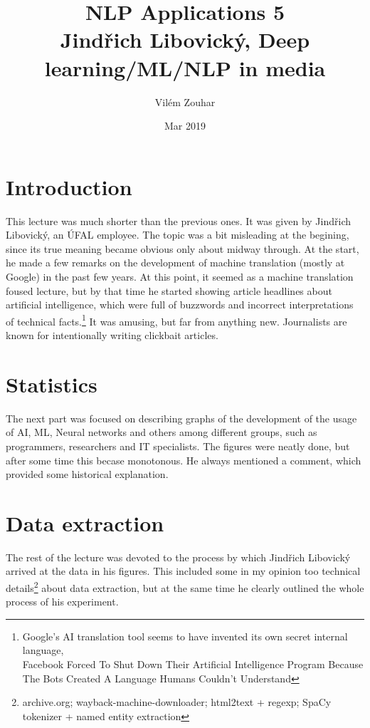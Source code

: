\documentclass[a4paper]{article}
\begin{document}
\title{NLP Applications 5\\Jindřich Libovický, Deep learning/ML/NLP in media}
\author{Vilém Zouhar}
\date{Mar 2019}
\maketitle 

\section*{Introduction}

This lecture was much shorter than the previous ones. It was given by Jindřich Libovický, an ÚFAL employee. The topic was a bit misleading at the begining, since its true meaning became obvious only about midway through. At the start, he made a few remarks on the development of machine translation (mostly at Google) in the past few years. At this point, it seemed as a machine translation foused lecture, but by that time he started showing article headlines about artificial intelligence, which were full of buzzwords and incorrect interpretations of technical facts.\footnote{Google’s AI translation tool seems to have invented its own secret internal language,\\Facebook Forced To Shut Down Their Artificial Intelligence Program Because The Bots Created A Language Humans Couldn't Understand} It was amusing, but far from anything new. Journalists are known for intentionally writing clickbait articles.

\section*{Statistics}

The next part was focused on describing graphs of the development of the usage of AI, ML, Neural networks and others among different groups, such as programmers, researchers and IT specialists. The figures were neatly done, but after some time this becase monotonous. He always mentioned a comment, which provided some historical explanation.

\section*{Data extraction}

The rest of the lecture was devoted to the process by which Jindřich Libovický arrived at the data in his figures. This included some in my opinion too technical details\footnote{archive.org; wayback-machine-downloader; html2text + regexp; SpaCy tokenizer + named entity extraction} about data extraction, but at the same time he clearly outlined the whole process of his experiment.
\end{document}
